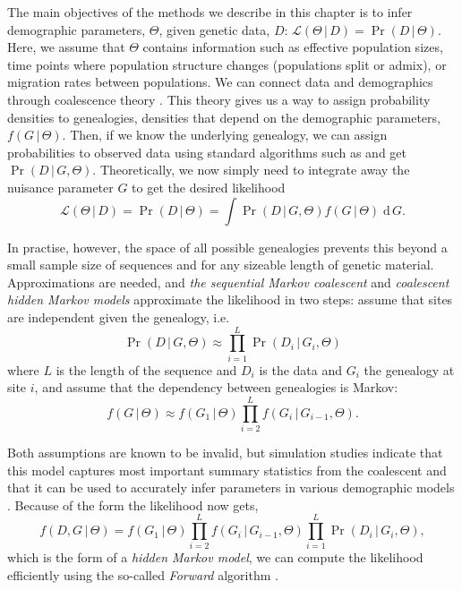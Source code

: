 \documentclass[graybox]{svmult}
\renewcommand{\lhd}{\ensuremath{\mathcal{L}}}
\newcommand{\intd}{\ensuremath{\mathrm{\;d\,}}}
\begin{document}
The main objectives of the methods we describe in this chapter is to infer demographic parameters, $\Theta$, given genetic data, $D$: $\lhd(\Theta\,|\,D)=\Pr(D\,|\,\Theta)$. Here, we assume that $\Theta$ contains information such as effective population sizes, time points where population structure changes (populations split or admix), or migration rates between populations. We can connect data and demographics through coalescence theory \cite{Hein:2004ta}. This theory gives us a way to assign probability densities to genealogies, densities that depend on the demographic parameters, $f(G\,|\,\Theta)$. Then, if we know the underlying genealogy, we can assign probabilities to observed data using standard algorithms such as \citet{Felsenstein_1981} and get $\Pr(D\,|\,G,\Theta)$. Theoretically, we now simply need to integrate away the nuisance parameter $G$ to get the desired likelihood
\begin{equation}
	\label{eq:likelihood}
	\lhd(\Theta\,|\,D) = \Pr(D\,|\,\Theta)
	= \int \Pr(D\,|\,G,\Theta) f(G\,|\,\Theta) \intd G .
\end{equation}

In practise, however, the space of all possible genealogies prevents this beyond a small sample size of sequences and for any sizeable length of genetic material. Approximations are needed, and \emph{the sequential Markov coalescent} and \emph{coalescent hidden Markov models} approximate the likelihood in two steps: assume that sites are independent given the genealogy, i.e.
\begin{equation}
  \Pr(D\,|\,G,\Theta) \approx
  \prod_{i=1}^L \Pr(D_i\,|\,G_i,\Theta)
\end{equation}
where $L$ is the length of the sequence and $D_i$ is the data and $G_i$ the genealogy at site $i$, and assume that the dependency between genealogies is Markov:
\begin{equation}
  \label{eq:markov-genealogy}
  f(G\,|\,\Theta) \approx
  f(G_1\,|\,\Theta)\prod_{i=2}^{L}f(G_{i}\,|\,G_{i-1},\Theta)
  .
\end{equation}

Both assumptions are known to be invalid, but simulation studies indicate that this model captures most important summary statistics from the coalescent \cite{McVean:2005hoa,Marjoram:2006hpa} and that it can be used to accurately infer parameters in various demographic models \cite{Mailund:2011dva,Mailund:2012ewa,Cheng:2015kia}. Because of the form the likelihood now gets,
\begin{equation}
  \label{eq:coalhmm-joint-probability}
  f(D,G\,|\,\Theta) =
  	f(G_1\,|\,\Theta)
  	\prod_{i=2}^{L}f(G_{i}\,|\,G_{i-1},\Theta)
  	\prod_{i=1}^L \Pr(D_i\,|\,G_i,\Theta)
  	,
\end{equation}
which is the form of a \emph{hidden Markov model}, we can compute the likelihood efficiently using the so-called \emph{Forward} algorithm \cite[chapter 3]{durbin1998biological}.
\end{document}
